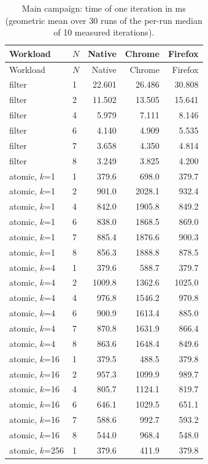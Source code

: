 {\small
\begin{longtable}{llrrr}
\caption{Main campaign: time of one iteration in ms (geometric mean over 30 runs of the per-run median of 10 measured iterations).}\label{tab:times} \\
\toprule
Workload & $N$ & Native & Chrome & Firefox \\
\midrule
\endfirsthead
\toprule
Workload & $N$ & Native & Chrome & Firefox \\
\midrule
\endhead
\bottomrule
\endfoot
filter & 1 & 22.601 & 26.486 & 30.808 \\
filter & 2 & 11.502 & 13.505 & 15.641 \\
filter & 4 & 5.979 & 7.111 & 8.146 \\
filter & 6 & 4.140 & 4.909 & 5.535 \\
filter & 7 & 3.658 & 4.350 & 4.814 \\
filter & 8 & 3.249 & 3.825 & 4.200 \\
\midrule
atomic, $k$=1 & 1 & 379.6 & 698.0 & 379.7 \\
atomic, $k$=1 & 2 & 901.0 & 2028.1 & 932.4 \\
atomic, $k$=1 & 4 & 842.0 & 1905.8 & 849.2 \\
atomic, $k$=1 & 6 & 838.0 & 1868.5 & 869.0 \\
atomic, $k$=1 & 7 & 885.4 & 1876.6 & 900.3 \\
atomic, $k$=1 & 8 & 856.3 & 1888.8 & 878.5 \\
\midrule
atomic, $k$=4 & 1 & 379.6 & 588.7 & 379.7 \\
atomic, $k$=4 & 2 & 1009.8 & 1362.6 & 1025.0 \\
atomic, $k$=4 & 4 & 976.8 & 1546.2 & 970.8 \\
atomic, $k$=4 & 6 & 900.9 & 1613.4 & 885.0 \\
atomic, $k$=4 & 7 & 870.8 & 1631.9 & 866.4 \\
atomic, $k$=4 & 8 & 863.6 & 1648.4 & 849.6 \\
\midrule
atomic, $k$=16 & 1 & 379.5 & 488.5 & 379.8 \\
atomic, $k$=16 & 2 & 957.3 & 1099.9 & 989.7 \\
atomic, $k$=16 & 4 & 805.7 & 1124.1 & 819.7 \\
atomic, $k$=16 & 6 & 646.1 & 1029.5 & 651.1 \\
atomic, $k$=16 & 7 & 588.6 & 992.7 & 593.2 \\
atomic, $k$=16 & 8 & 544.0 & 968.4 & 548.0 \\
\midrule
atomic, $k$=256 & 1 & 379.6 & 411.9 & 379.8 \\

\end{longtable}}
